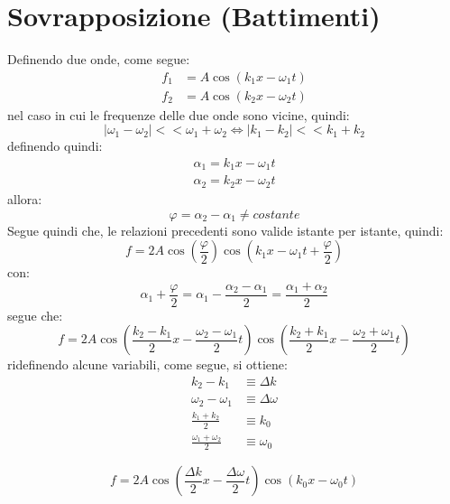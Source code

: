 \documentclass[11pt, a4paper, openright]{book}
\theoremstyle{plain}
\theoremstyle{definition}
\begin{document}
\newpage

\section{Sovrapposizione (Battimenti)}
Definendo due onde, come segue:
\begin{align}
    f_1 & = A\cos(k_1 x - \omega_1 t) \\
    f_2 & = A\cos(k_2 x - \omega_2 t)
\end{align}
nel caso in cui le frequenze delle due onde sono vicine, quindi:
\begin{equation}
    |\omega_1 - \omega_2| << \omega_1 + \omega_2 \iff |k_1 - k_2| << k_1 + k_2 
\end{equation}
definendo quindi:
\begin{align}
    \alpha_1 = k_1 x - \omega_1 t \\
    \alpha_2 = k_2 x - \omega_2 t
\end{align}
allora:
\begin{equation}
    \varphi = \alpha_2 - \alpha_1 \not = costante
\end{equation}
Segue quindi che, le relazioni precedenti sono valide istante per istante, quindi:
\begin{equation}
    f = 2A\cos(\frac{\varphi}{2})\cos(k_1x - \omega_1t + \frac{\varphi}{2})
\end{equation}
con:
\begin{equation}
    \alpha_1 + \frac{\varphi}{2} = \alpha_1 - \frac{\alpha_2 - \alpha_1}{2} = \frac{\alpha_1 + \alpha_2}{2}
\end{equation}
segue che:
\begin{equation}
    f = 2A\cos(\frac{k_2 - k_1}{2}x - \frac{\omega_2 - \omega_1}{2}t)\cos(\frac{k_2 + k_1}{2}x - \frac{\omega_2 + \omega_1}{2}t)
\end{equation}
ridefinendo alcune variabili, come segue, si ottiene:
\begin{align}
    k_2 - k_1 & \equiv \Delta k \\
    \omega_2 - \omega_1 & \equiv \Delta \omega \\
    \frac{k_1 + k_2}{2} & \equiv k_0 \\
    \frac{\omega_1 + \omega_2}{2} & \equiv \omega_0
\end{align}

\begin{equation}
    f = 2A\cos(\frac{\Delta k}{2}x - \frac{\Delta \omega}{2}t)\cos(k_0x - \omega_0t)
\end{equation}
\end{document}
